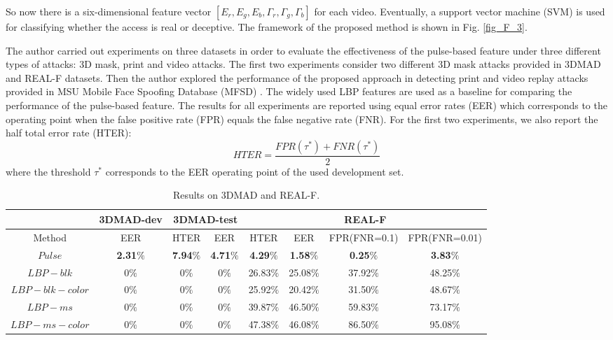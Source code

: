 \documentclass[journal]{IEEEtran}
\begin{document}
So now there is a six-dimensional feature vector $[E_r, E_g, E_b, {\Gamma}_r, {\Gamma}_g, {\Gamma}_b]$ for each video. Eventually, a support vector machine (SVM) \cite{chang2011libsvm} is used for classifying whether the access is real or deceptive. The framework of the proposed method is shown in Fig. \ref{fig_F_3}.

The author carried out experiments on three datasets in order to evaluate the effectiveness of the pulse-based feature under three different types of attacks: 3D mask, print and video attacks.  The first two experiments consider two different 3D mask attacks provided in 3DMAD and REAL-F datasets. Then the author explored the performance of the proposed approach in detecting print and video replay attacks provided in MSU Mobile Face Spoofing Database (MFSD) \cite{wen2015face}. The widely used LBP features are used as a baseline for comparing the performance of the pulse-based feature.  The results for all experiments are reported using equal error rates (EER) which corresponds to the operating point when the false positive rate (FPR) equals the false negative rate (FNR). For the first two experiments, we also report the half total error rate (HTER):
\begin{equation}
\label{eq_F_2}
HTER = \dfrac{FPR(\tau^{*})+FNR(\tau^{*})}{2}
\end{equation}
where the threshold $\tau^{*}$ corresponds to the EER operating point of the used development set.

\begin{table}[ht]
	\renewcommand{\arraystretch}{1.3}
	\normalsize
	\centering
	\caption{Results on 3DMAD and REAL-F.}
	\label{tab_F_1}
	\begin{tabular}{|c|c|c|c|c|c|c|c|}
		\hline 
		&3DMAD-dev & \multicolumn{2}{c|}{3DMAD-test} & \multicolumn{4}{c|}{REAL-F} \\ 
		\hline \hline
		Method & EER & HTER & EER & HTER & EER & FPR(FNR=0.1) & FPR(FNR=0.01) \\ 
		\hline 
		$Pulse$ & \textbf{2.31$\%$} & \textbf{7.94$\%$} & \textbf{4.71$\%$} & \textbf{4.29$\%$} & \textbf{1.58$\%$} & \textbf{0.25$\%$} & \textbf{3.83$\%$} \\ 
		\hline 
		$LBP-blk$ & 0$\%$ & 0$\%$ & 0$\%$ & 26.83$\%$ & 25.08$\%$ & 37.92$\%$ & 48.25$\%$ \\ 
		\hline 
		$LBP-blk-color$ & 0$\%$ & 0$\%$ & 0$\%$ & 25.92$\%$ & 20.42$\%$ & 31.50$\%$ & 48.67$\%$ \\ 
		\hline 
		$LBP-ms$ & 0$\%$ & 0$\%$ & 0$\%$ & 39.87$\%$ & 46.50$\%$ & 59.83$\%$ & 73.17$\%$ \\ 
		\hline 
		$LBP-ms-color$ & 0$\%$ & 0$\%$ & 0$\%$ & 47.38$\%$ & 46.08$\%$ & 86.50$\%$ & 95.08$\%$ \\ 
		\hline 
	\end{tabular} 
\end{table}
\end{document}
